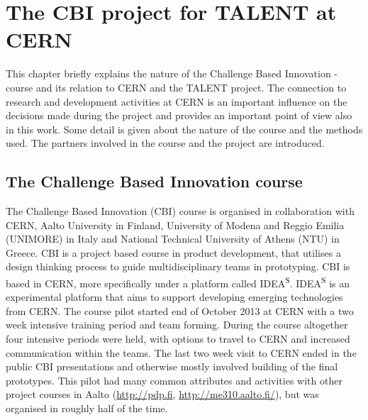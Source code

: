 \documentclass[english,12pt,a4paper,pdftex]{article}
\begin{document}

\clearpage



\section{The CBI project for TALENT at CERN}

This chapter briefly explains the nature of the Challenge Based Innovation -course and its relation to CERN and the TALENT project. The connection to research and development activities at CERN is an important influence on the decisions made during the project and provides an important point of view also in this work. Some detail is given about the nature of the course and the methods used. The partners involved in the course and the project are introduced. 


\subsection{The Challenge Based Innovation course}

The Challenge Based Innovation (CBI) course is organised in collaboration with CERN, Aalto University in Finland, University of Modena and Reggio Emilia (UNIMORE) in Italy and National Technical University of Athens (NTU) in Greece. CBI is a project based course in product development, that utilises a design thinking process to guide multidisciplinary teams in prototyping. CBI is based in CERN, more specifically under a platform called IDEA\textsuperscript{S}. IDEA\textsuperscript{S} is an experimental platform that aims to support developing emerging technologies from CERN. The course pilot started end of October 2013 at CERN with a two week intensive training period and team forming. During the course altogether four intensive periods were held, with options to travel to CERN and increased communication within the teams. The last two week visit to CERN ended in the public CBI presentations and otherwise mostly involved building of the final prototypes. This pilot had many common attributes and activities with other project courses in Aalto (\url{http://pdp.fi}, \url{http://me310.aalto.fi/}), but was organised in roughly half of the time.
\end{document}
